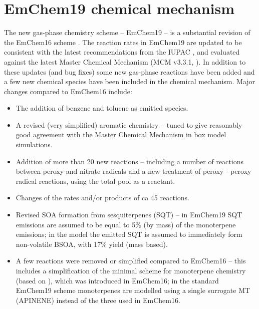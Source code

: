\section{EmChem19 chemical mechanism}
\label{sec:EmChem19}

The new gas-phase chemistry scheme -- EmChem19 -- is a substantial
revision of the EmChem16 scheme \citep{R2017:ModDev}.  The reaction rates
in EmChem19 are updated to be consistent with the latest recommendations
from the IUPAC \citep{IUPAC2019,Atkinson2004,Atkinson2006}, and evaluated against
the latest Master Chemical Mechanism (MCM v3.3.1, 
\citealt[][and refs therein]{Jenkin2015}). In addition to
these updates (and bug fixes) some new gas-phase reactions have been
added and a few new chemical species have been included in the chemical
mechanism.  Major changes compared to EmChem16 include:

\begin{itemize}
\item
The addition of benzene and toluene as emitted species. 
\item
A revised (very simplified) aromatic chemistry -- tuned to give
reasonably good agreement with the Master Chemical Mechanism 
\citep[MCM, see][]{Jenkin2015} in box model simulations.

\item
Addition of more than 20 new reactions -- including a number of reactions
between peroxy and nitrate radicals and a new treatment of peroxy -
peroxy radical reactions, using the total   pool as a reactant.

\item
Changes of the rates and/or products of ca 45 reactions.

\item
Revised SOA formation from sesquiterpenes (SQT) -- in EmChem19 SQT
emissions are assumed to be equal to 5\% (by mass) of the monoterpene
emissions; in the model the emitted SQT is assumed to immediately form
non-volatile BSOA, with 17\% yield (mass based).

\item
A few reactions were removed or simplified compared to EmChem16 -- this
includes a simplification of the minimal scheme for monoterpene chemistry
(based on \citealp{LamarqueCAMchem2012}), which was introduced in EmChem16;
in the standard EmChem19 scheme monoterpenes are modelled using a single
surrogate MT (APINENE) instead of the three used in EmChem16.

\end{itemize}
 
